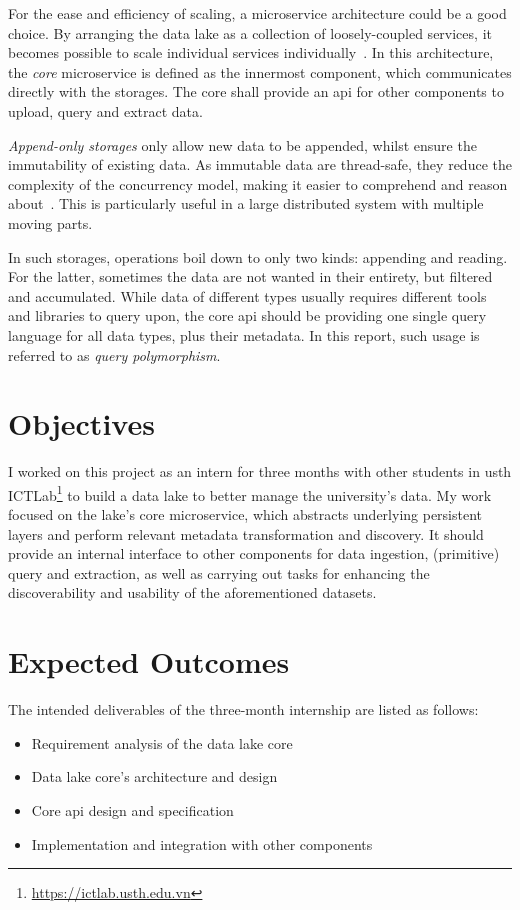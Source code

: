 \documentclass[a4paper,12pt]{book}
\begin{document}
For the ease and efficiency of scaling, a microservice architecture
could be a good choice.  By arranging the data lake as a collection
of loosely-coupled services, it becomes possible to scale individual services
individually~\cite{micro}.  In this architecture, the \emph{core} microservice
is defined as the innermost component, which communicates directly
with the storages.  The core shall provide an \gls{api} for other components
to upload, query and extract data.

\emph{Append-only storages} only allow new data to be appended, whilst ensure
the immutability of existing data.  As immutable data are thread-safe,
they reduce the complexity of the concurrency model, making it easier
to comprehend and reason about~\cite{pure}.  This is particularly useful
in a large distributed system with multiple moving parts.

In such storages, operations boil down to only two kinds: appending and reading.
For the latter, sometimes the data are not wanted in their entirety,
but filtered and accumulated.  While data of different types usually requires
different tools and libraries to query upon, the core \gls{api} should be
providing one single query language for all data types, plus their metadata.
In this report, such usage is referred to as \emph{query polymorphism}.

\section{Objectives}
I worked on this project as an intern for three months with other students
in \gls{usth} ICTLab\footnote{\url{https://ictlab.usth.edu.vn}} to build
a data lake to better manage the university's data.  My work focused on
the lake's core microservice, which abstracts underlying persistent layers
and perform relevant metadata transformation and discovery.  It should provide
an internal interface to other components for data ingestion, (primitive)
query and extraction, as well as carrying out tasks for enhancing
the discoverability and usability of the aforementioned datasets.

\section{Expected Outcomes}
The intended deliverables of the three-month internship are listed as follows:
\begin{itemize}
  \item Requirement analysis of the data lake core
  \item Data lake core's architecture and design
  \item Core \gls{api} design and specification
  \item Implementation and integration with other components
\end{itemize}
\end{document}

